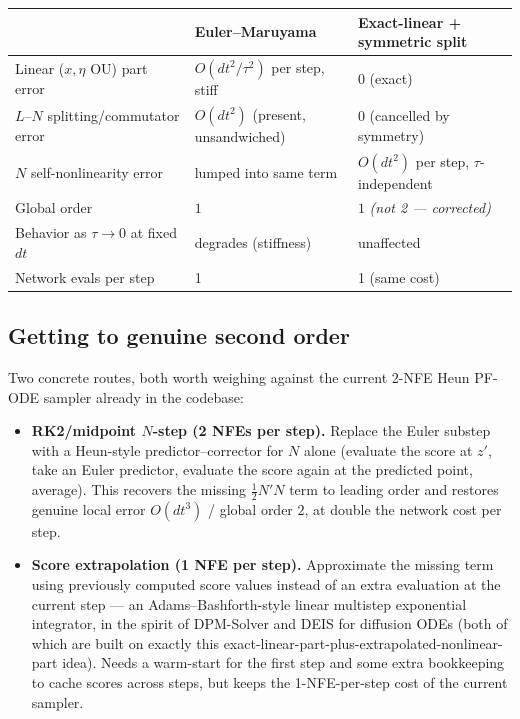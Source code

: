 \documentclass[11pt]{article}
\begin{document}
\begin{center}
\begin{tabular}{lll}
\toprule
& Euler--Maruyama & Exact-linear + symmetric split \\
\midrule
Linear ($x,\eta$ OU) part error & $O(dt^2/\tau^2)$ per step, stiff & $0$ (exact) \\
$L$--$N$ splitting/commutator error & $O(dt^2)$ (present, unsandwiched) & $0$ (cancelled by symmetry) \\
$N$ self-nonlinearity error & lumped into same term & $O(dt^2)$ per step, $\tau$-independent \\
Global order & $1$ & $1$ \emph{(not 2 — corrected)} \\
Behavior as $\tau\to0$ at fixed $dt$ & degrades (stiffness) & unaffected \\
Network evals per step & 1 & 1 (same cost) \\
\bottomrule
\end{tabular}
\end{center}

\subsection{Getting to genuine second order}

Two concrete routes, both worth weighing against the current 2-NFE Heun
PF-ODE sampler already in the codebase:
\begin{itemize}
\item \textbf{RK2/midpoint $N$-step (2 NFEs per step).} Replace the Euler
substep with a Heun-style predictor--corrector for $N$ alone (evaluate the
score at $z'$, take an Euler predictor, evaluate the score again at the
predicted point, average). This recovers the missing $\frac12 N'N$ term to
leading order and restores genuine local error $O(dt^3)$ / global order $2$,
at double the network cost per step.
\item \textbf{Score extrapolation (1 NFE per step).} Approximate the missing
term using previously computed score values instead of an extra evaluation
at the current step — an Adams--Bashforth-style linear multistep exponential
integrator, in the spirit of DPM-Solver \cite{lu2022dpmsolver} and DEIS
\cite{zhang2022deis} for diffusion ODEs (both of which are built on exactly
this exact-linear-part-plus-extrapolated-nonlinear-part idea). Needs a
warm-start for the first step and some extra bookkeeping to cache scores
across steps, but keeps the 1-NFE-per-step cost of the current sampler.
\end{itemize}
\end{document}
